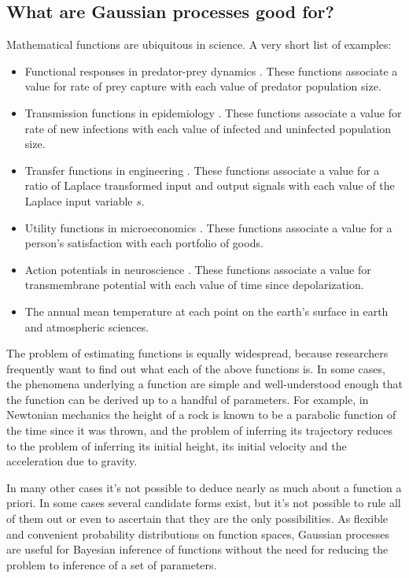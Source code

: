 \documentclass[]{manual}
\begin{document}
\subsection{What are Gaussian processes good for?}\label{sub:applications}
Mathematical functions are ubiquitous in science. A very short list of examples:
\begin{itemize}
    \item Functional responses in predator-prey dynamics \cite{mathecol}. These functions associate a value for rate of prey capture with each value of predator population size.
    \item Transmission functions in epidemiology \cite{andersonmay}. These functions associate a value for rate of new infections with each value of infected and uninfected population size.
    \item Transfer functions in engineering \cite{duffy}. These functions associate a value for a ratio of Laplace transformed input and output signals with each value of the Laplace input variable $s$.
    \item Utility functions in microeconomics \cite{microecon}. These functions associate a value for a person's satisfaction with each portfolio of goods.
    \item Action potentials in neuroscience \cite{neuro}. These functions associate a value for transmembrane potential with each value of time since depolarization.
    \item The annual mean temperature at each point on the earth's surface in earth and atmospheric sciences.
\end{itemize}

The problem of estimating functions is equally widespread, because researchers frequently want to find out what each of the above functions is. In some cases, the phenomena underlying a function are simple and well-understood enough that the function can be derived up to a handful of parameters. For example, in Newtonian mechanics the height of a rock is known to be a parabolic function of the time since it was thrown, and the problem of inferring its trajectory reduces to the problem of inferring its initial height, its initial velocity and the acceleration due to gravity.

In many other cases it's not possible to deduce nearly as much about a function a priori. In some cases several candidate forms exist, but it's not possible to rule all of them out or even to ascertain that they are the only possibilities. As flexible and convenient probability distributions on function spaces, Gaussian processes are useful for Bayesian inference of functions without the need for reducing the problem to inference of a set of parameters.
\end{document}

